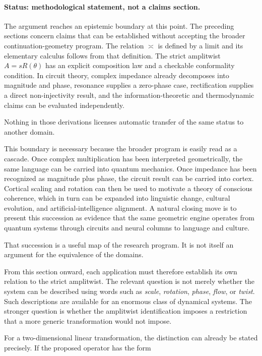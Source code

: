\documentclass[11pt]{article}
\newcommand{\ulteq}{\mathrel{\text{≍}}}
\begin{document}
\paragraph{Status: methodological statement, not a claims section.}

The argument reaches an epistemic boundary at this point. The preceding sections concern claims that can be established without accepting the broader continuation-geometry program. The relation $\ulteq$ is defined by a limit and its elementary calculus follows from that definition. The strict amplitwist $A=sR(\theta)$ has an explicit composition law and a checkable conformality condition. In circuit theory, complex impedance already decomposes into magnitude and phase, resonance supplies a zero-phase case, rectification supplies a direct non-injectivity result, and the information-theoretic and thermodynamic claims can be evaluated independently.

Nothing in those derivations licenses automatic transfer of the same status to another domain.

This boundary is necessary because the broader program is easily read as a cascade. Once complex multiplication has been interpreted geometrically, the same language can be carried into quantum mechanics. Once impedance has been recognized as magnitude plus phase, the circuit result can be carried into cortex. Cortical scaling and rotation can then be used to motivate a theory of conscious coherence, which in turn can be expanded into linguistic change, cultural evolution, and artificial-intelligence alignment. A natural closing move is to present this succession as evidence that the same geometric engine operates from quantum systems through circuits and neural columns to language and culture.

That succession is a useful map of the research program. It is not itself an argument for the equivalence of the domains.

From this section onward, each application must therefore establish its own relation to the strict amplitwist. The relevant question is not merely whether the system can be described using words such as \emph{scale}, \emph{rotation}, \emph{phase}, \emph{flow}, or \emph{twist}. Such descriptions are available for an enormous class of dynamical systems. The stronger question is whether the amplitwist identification imposes a restriction that a more generic transformation would not impose.

For a two-dimensional linear transformation, the distinction can already be stated precisely. If the proposed operator has the form
\end{document}
